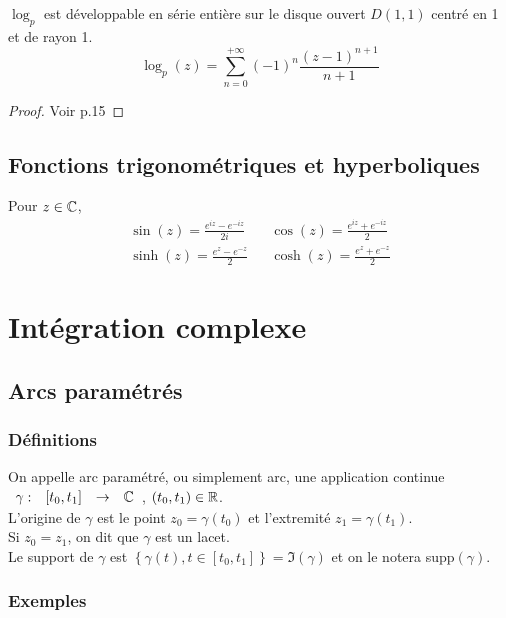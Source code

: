 \documentclass[]{report}
\begin{document}
\begin{lm}{}{}
    $\log_p$ est développable en série entière sur le disque ouvert $D(1,1)$ centré en 1 et de rayon 1.$$\log_p(z)=\sum_{n=0}^{+\infty}(-1)^n\frac{(z-1)^{n+1}}{n+1}$$
\end{lm}

\begin{proof}{}{}
    Voir p.15
\end{proof}

\section{Fonctions trigonométriques et hyperboliques}

Pour $z\in\mathbb{C}$, \begin{align*}
    \sin(z)=\frac{e^{iz}-e^{-iz}}{2i} && \cos(z)=\frac{e^{iz}+e^{-iz}}{2}\\
    \sinh(z)=\frac{e^{z}-e^{-z}}{2} && \cosh(z)=\frac{e^{z}+e^{-z}}{2}
\end{align*}

\chapter{Intégration complexe}

\section{Arcs paramétrés}

\subsection{Définitions}

On appelle arc paramétré, ou simplement arc, une application continue $\begin{array}{ccccc}
\gamma : & [t_0,t_1] & \to & \mathbb{C} \\
\end{array}$, $(t_0,t_1)\in\mathbb{R}$.\\
L'origine de $\gamma$ est le point $z_0=\gamma(t_0)$ et l'extremité $z_1=\gamma(t_1)$.\\
Si $z_0=z_1$, on dit que $\gamma$ est un lacet.\\
Le support de $\gamma$ est $\left\{\gamma(t),t\in[t_0,t_1]\right\}=\Im(\gamma)$ et on le notera supp$(\gamma)$.

\subsection{Exemples}
\end{document}
